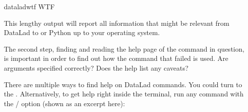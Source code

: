 \begin{sphinxVerbatim}[commandchars=\\\{\}]
dataladwtf
WTF
\end{sphinxVerbatim}

\sphinxAtStartPar
This lengthy output will report all information that might
be relevant \textendash{} from DataLad to {\hyperref[\detokenize{glossary:term-git-annex}]{}} or Python
up to your operating system.

\sphinxAtStartPar
The second step, finding and reading the help page of the command
in question, is important in order to find out how the
command that failed is used. Are arguments specified correctly?
Does the help list any caveats?

\sphinxAtStartPar
There are multiple ways to find help on DataLad commands.
You could turn to the .
Alternatively, to get help right inside the terminal,
run any command with the / option (shown
as an excerpt here):

